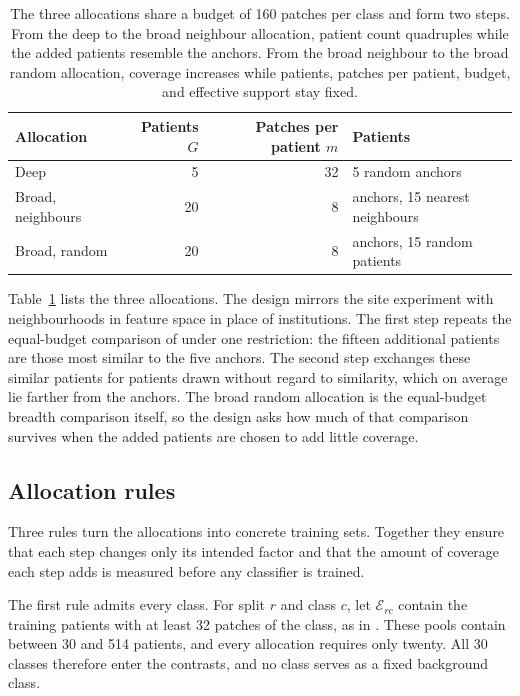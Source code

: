\documentclass[11pt]{article}
\begin{document}
\begin{table}[htbp]
\centering
\renewcommand{\arraystretch}{1.15}
\begin{tabular}{@{}lrrl@{}}
\toprule
Allocation & Patients $G$ & Patches per patient $m$ & Patients \\
\midrule
Deep & 5 & 32 & 5 random anchors \\
Broad, neighbours & 20 & 8 & anchors, 15 nearest neighbours \\
Broad, random & 20 & 8 & anchors, 15 random patients \\
\bottomrule
\end{tabular}
\caption{The three allocations share a budget of 160 patches per class and form two steps. From the deep to the broad neighbour allocation, patient count quadruples while the added patients resemble the anchors. From the broad neighbour to the broad random allocation, coverage increases while patients, patches per patient, budget, and effective support stay fixed.}
\label{tab:allocations}
\end{table}

\noindent Table~\ref{tab:allocations} lists the three allocations. The design mirrors the site experiment \citep{queisler2026siteCoverage} with neighbourhoods in feature space in place of institutions. The first step repeats the equal-budget comparison of \citet{queisler2026effectiveSupport} under one restriction: the fifteen additional patients are those most similar to the five anchors. The second step exchanges these similar patients for patients drawn without regard to similarity, which on average lie farther from the anchors. The broad random allocation is the equal-budget breadth comparison itself, so the design asks how much of that comparison survives when the added patients are chosen to add little coverage.

\subsection{Allocation rules}
\label{sec:allocation}
Three rules turn the allocations into concrete training sets. Together they ensure that each step changes only its intended factor and that the amount of coverage each step adds is measured before any classifier is trained.

The first rule admits every class. For split $r$ and class $c$, let $\mathcal E_{rc}$ contain the training patients with at least 32 patches of the class, as in \citet{queisler2026effectiveSupport}. These pools contain between 30 and 514 patients, and every allocation requires only twenty. All 30 classes therefore enter the contrasts, and no class serves as a fixed background class.
\end{document}
